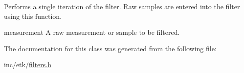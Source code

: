 Performs a single iteration of the filter. Raw samples are entered into the filter using this function. 

\begin{DoxyItemize}
\item measurement A raw measurement or sample to be filtered. \end{DoxyItemize}


The documentation for this class was generated from the following file\-:\begin{DoxyCompactItemize}
\item 
inc/etk/\hyperlink{filters_8h}{filters.\-h}\end{DoxyCompactItemize}
